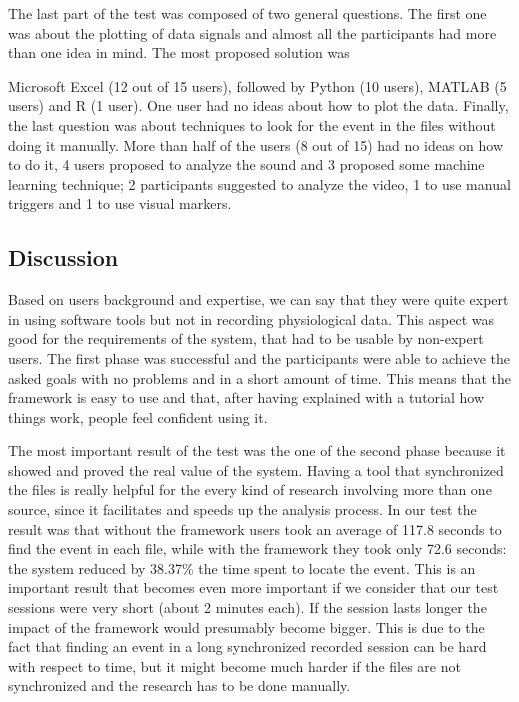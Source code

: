 \documentclass[binding=0.6cm,LaM]{sapthesis}
\begin{document}
The last part of the test was composed of two general questions. The first one was about the plotting of data signals and almost all the participants had more than one idea in mind. The most proposed solution was {Microsoft Excel (12 out of 15 users), followed by Python (10 users), MATLAB (5 users) and R (1 user). One user had no ideas about how to plot the data. 
Finally, the last question was about techniques to look for the event in the files without doing it manually. More than half of the users (8 out of 15) had no ideas on how to do it, 4 users proposed to analyze the sound and 3 proposed some machine learning technique; 2 participants suggested to analyze the video, 1 to use manual triggers and 1 to use visual markers. 

\subsection{Discussion}
Based on users background and expertise, we can say that they were quite expert in using software tools but not in recording physiological data. This aspect was good for the requirements of the system, that had to be usable by non-expert users. The first phase was successful and the participants were able to achieve the asked goals with no problems and in a short amount of time. This means that the framework is easy to use and that, after having explained with a tutorial how things work, people feel confident using it. 

The most important result of the test was the one of the second phase because it showed and proved the real value of the system. Having a tool that synchronized the files is really helpful for the every kind of research involving more than one source, since it facilitates and speeds up the analysis process. In our test the result was that without the framework users took an average of 117.8 seconds to find the event in each file, while with the framework they took only 72.6 seconds: the system reduced by 38.37\% the time spent to locate the event. This is an important result that becomes even more important if we consider that our test sessions were very short (about 2 minutes each). If the session lasts longer the impact of the framework would presumably become bigger. This is due to the fact that finding an event in a long synchronized recorded session can be hard with respect to time, but it might become much harder if the files are not synchronized and the research has to be done manually. 

}
\end{document}

